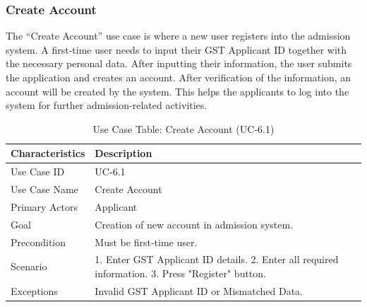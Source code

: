 \subsubsection{Create Account}
The “Create Account” use case is where a new user registers into the admission system. A first-time user needs to input their GST Applicant ID together with the necessary personal data. After inputting their information, the user submits the application and creates an account. After verification of the information, an account will be created by the system. This helps the applicants to log into the system for further admission-related activities.
\begin{table}[H]
    \centering
    \small
    \renewcommand{\arraystretch}{1.4}
    \caption{Use Case Table: Create Account (UC-6.1)}
    \label{tab:create_account}
    
    \begin{tabularx}{\textwidth}{|l|X|}
        \hline
        \rowcolor[gray]{0.9} {Characteristics} & {Description} \\ \hline
        Use Case ID & UC-6.1 \\ \hline
        Use Case Name & Create Account \\ \hline
        Primary Actors & Applicant \\ \hline
        Goal & Creation of new account in admission system. \\ \hline
        Precondition & Must be first-time user. \\ \hline
        Scenario & 1. Enter GST Applicant ID details. 2. Enter all required information. 3. Press "Register" button. \\ \hline
        Exceptions & Invalid GST Applicant ID or Mismatched Data. \\ \hline
    \end{tabularx}
\end{table}
\FloatBarrier